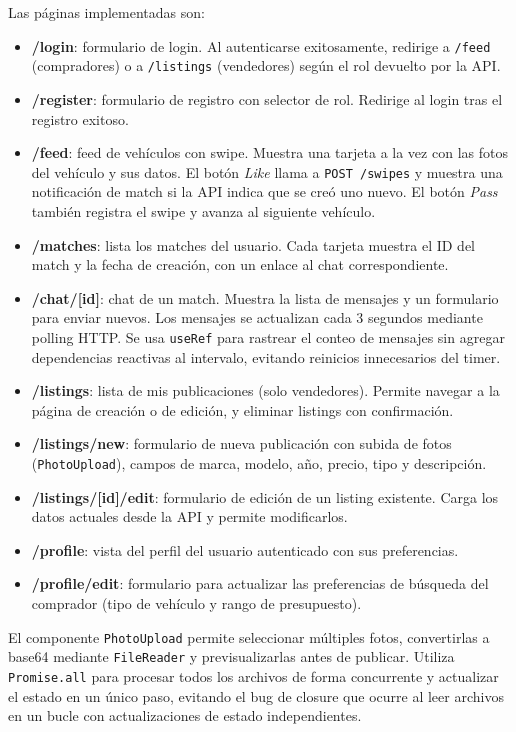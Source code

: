 \documentclass[12pt,a4paper]{article}
\begin{document}
Las páginas implementadas son:
\begin{itemize}
  \item \textbf{/login}: formulario de login. Al autenticarse exitosamente, redirige a
        \texttt{/feed} (compradores) o a \texttt{/listings} (vendedores) según el rol devuelto
        por la API.
  \item \textbf{/register}: formulario de registro con selector de rol. Redirige al login tras
        el registro exitoso.
  \item \textbf{/feed}: feed de vehículos con swipe. Muestra una tarjeta a la vez con las fotos
        del vehículo y sus datos. El botón \emph{Like} llama a \texttt{POST /swipes} y muestra
        una notificación de match si la API indica que se creó uno nuevo. El botón \emph{Pass}
        también registra el swipe y avanza al siguiente vehículo.
  \item \textbf{/matches}: lista los matches del usuario. Cada tarjeta muestra el ID del match
        y la fecha de creación, con un enlace al chat correspondiente.
  \item \textbf{/chat/[id]}: chat de un match. Muestra la lista de mensajes y un formulario para
        enviar nuevos. Los mensajes se actualizan cada 3 segundos mediante polling HTTP. Se usa
        \texttt{useRef} para rastrear el conteo de mensajes sin agregar dependencias reactivas
        al intervalo, evitando reinicios innecesarios del timer.
  \item \textbf{/listings}: lista de mis publicaciones (solo vendedores). Permite navegar a la
        página de creación o de edición, y eliminar listings con confirmación.
  \item \textbf{/listings/new}: formulario de nueva publicación con subida de fotos
        (\texttt{PhotoUpload}), campos de marca, modelo, año, precio, tipo y descripción.
  \item \textbf{/listings/[id]/edit}: formulario de edición de un listing existente. Carga los
        datos actuales desde la API y permite modificarlos.
  \item \textbf{/profile}: vista del perfil del usuario autenticado con sus preferencias.
  \item \textbf{/profile/edit}: formulario para actualizar las preferencias de búsqueda del
        comprador (tipo de vehículo y rango de presupuesto).
\end{itemize}

El componente \texttt{PhotoUpload} permite seleccionar múltiples fotos, convertirlas a base64
mediante \texttt{FileReader} y previsualizarlas antes de publicar. Utiliza \texttt{Promise.all}
para procesar todos los archivos de forma concurrente y actualizar el estado en un único paso,
evitando el bug de closure que ocurre al leer archivos en un bucle con actualizaciones de estado
independientes.
\end{document}
